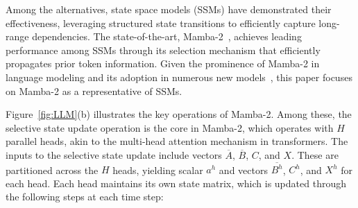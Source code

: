 %
%
Among the alternatives, state space models (SSMs) have demonstrated
their effectiveness, leveraging structured state transitions to
efficiently capture long-range dependencies.
%
The state-of-the-art, Mamba-2~\cite{mamba2}, achieves leading
performance among SSMs through its selection mechanism that
efficiently propagates prior token information.
%
Given the prominence of Mamba-2 in language modeling and its adoption
in numerous new models~\cite{huang2024mlmamba,
nvidia-mamba2, zamba2, codestral}, this
paper focuses on Mamba-2 as a representative of SSMs.
%

%
Figure~\ref{fig:LLM}(b) illustrates the key operations of Mamba-2.
%
Among these, the selective state update operation is the core in
Mamba-2, which operates with $H$ parallel heads, akin to the
multi-head attention mechanism in transformers.
%
The inputs to the selective state update include vectors
$\overline{A}$, $\overline{B}$, $C$, and $X$.
%
These are partitioned across the $H$ heads, yielding scalar $a^h$ and
vectors $\overline{B^h}$, $C^h$, and $X^h$ for each head.
%
Each head maintains its own state matrix, which is updated through
the following steps at each time step:
%
%

